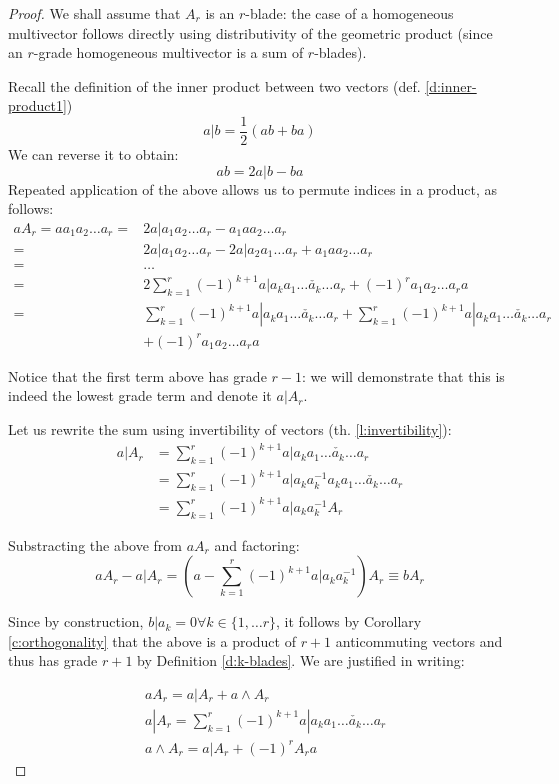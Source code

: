\begin{proof}
	We shall assume that $A_r$ is an $r$-blade: the case of a homogeneous multivector follows directly using distributivity of the geometric product (since an $r$-grade homogeneous multivector is a sum of $r$-blades).

	Recall the definition of the inner product between two vectors (def. \ref{d:inner-product1})
	\[a | b = \frac{1}{2}(ab + ba)\]
	We can reverse it to obtain:
	\[ab = 2 a | b - ba\]
	Repeated application of the above allows us to permute indices in a product, as follows:
	\begin{align*}
		aA_r = aa_1a_2 \ldots a_r = &2a|a_1a_2 \ldots a_r - a_1aa_2 \ldots a_r \\
		= &2a|a_1a_2 \ldots a_r - 2a|a_2a_1 \ldots a_r + a_1aa_2 \ldots a_r \\
		= &\ldots \\
		= &2 \sum_{k=1}^r (-1)^{k+1}a|a_k a_1 \ldots \check{a_k} \ldots a_r + (-1)^ra_1a_2 \ldots a_ra \\
		= &\sum_{k=1}^r (-1)^{k+1}a|a_k a_1 \ldots \check{a_k} \ldots a_r + \sum_{k=1}^r (-1)^{k+1}a|a_k a_1 \ldots \check{a_k} \ldots a_r \\
		&+ (-1)^ra_1a_2 \ldots a_ra
	\end{align*}

	Notice that the first term above has grade $r-1$: we will demonstrate that this is indeed the lowest grade term and denote it $a | A_r$.
	
	Let us rewrite the sum using invertibility of vectors (th. \ref{l:invertibility}):
	\begin{align*}
		a | A_r &= \sum_{k=1}^r (-1)^{k+1}a|a_k a_1 \ldots \check{a_k} \ldots a_r\\
				&= \sum_{k=1}^r (-1)^{k+1}a|a_k a_k^{-1}a_k a_1 \ldots \check{a_k} \ldots a_r\\
				&= \sum_{k=1}^r (-1)^{k+1}a|a_k a_k^{-1} A_r 
	\end{align*}

	Substracting the above from $aA_r$ and factoring:
	\[aA_r - a | A_r = (a - \sum_{k=1}^r (-1)^{k+1}a|a_k a_k^{-1})A_r \equiv bA_r\]
	
	Since by construction, $b | a_k = 0 \forall k \in \{1, \ldots r\}$, it follows by Corollary \ref{c:orthogonality} that the above is a product of $r+1$ anticommuting vectors and thus has grade $r+1$ by Definition \ref{d:k-blades}. We are justified in writing:

	\begin{align*}
		&aA_r = a | A_r + a \wedge A_r \\
		&a | A_r = \sum_{k=1}^r (-1)^{k+1}a|a_k a_1 \ldots \check{a_k} \ldots a_r \\
		&a \wedge A_r = a | A_r + (-1)^rA_ra
	\end{align*}


\end{proof}
